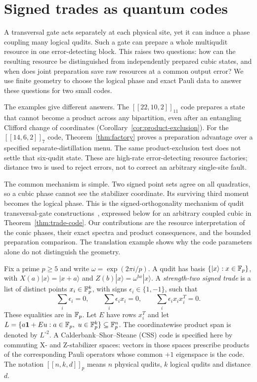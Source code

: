 \section{Signed trades as quantum codes}\label{sec:trades}
A transversal gate acts separately at each physical site, yet it can induce a
phase coupling many logical qudits. Such a gate can prepare a whole multiqudit
resource in one error-detecting block. This raises two questions: how can the
resulting resource be distinguished from independently prepared cubic states,
and when does joint preparation save raw resources at a common output error?
We use finite geometry to choose the logical phase and exact Pauli data to
answer these questions for two small codes.

The examples give different answers. The $[[22,10,2]]_{11}$ code prepares a
state that cannot become a product across any bipartition, even after an
entangling Clifford change of coordinates
(Corollary~\ref{cor:product-exclusion}). For the $[[14,6,2]]_7$ code,
Theorem~\ref{thm:factory} proves a preparation advantage over a specified
separate-distillation menu. The same product-exclusion test does not settle
that six-qudit state. These are high-rate error-detecting resource factories;
distance two is used to reject errors, not to correct an arbitrary single-site
fault.

The common mechanism is simple. Two signed point sets agree on all quadratics,
so a cubic phase cannot see the stabilizer coordinate. Its surviving third
moment becomes the logical phase. This is the signed-orthogonality mechanism
of qudit transversal-gate constructions~\cite{watson,cab,krishna}, expressed
below for an arbitrary coupled cubic in Theorem~\ref{thm:trade-code}.
Our contributions are the resource
interpretation of the conic phases, their exact spectra and product consequences,
and the bounded preparation comparison. The translation example shows why the
code parameters alone do not distinguish the geometry.

Fix a prime $p\geq5$ and write $\omega=\exp(2\pi i/p)$. A qudit has basis
$\{|x\rangle:x\in\mathbb F_p\}$, with $X(a)|x\rangle=|x+a\rangle$ and
$Z(b)|x\rangle=\omega^{bx}|x\rangle$. A \emph{strength-two signed trade}
is a list of distinct points $x_i\in\mathbb F_p^k$, with signs $\epsilon_i\in\{1,-1\}$,
such that
\begin{equation}\label{eq:moments}
 \sum_i\epsilon_i=0,\qquad \sum_i\epsilon_i x_i=0,\qquad
 \sum_i\epsilon_i x_ix_i^T=0.
\end{equation}
These equalities are in $\mathbb F_p$. Let $E$ have rows $x_i^T$ and let
$L=\{a\one+Eu:a\in\Fp,\ u\in\Fp^k\}\subseteq\Fp^n$.
The coordinatewise product span is denoted by $L^{\circ2}$.
A Calderbank--Shor--Steane (CSS) code is specified here by commuting X- and
Z-stabilizer spaces: vectors in those spaces prescribe products of the corresponding
Pauli operators whose common $+1$ eigenspace is the code. The notation
$[[n,k,d]]_p$ means $n$ physical qudits, $k$ logical qudits and distance $d$.

